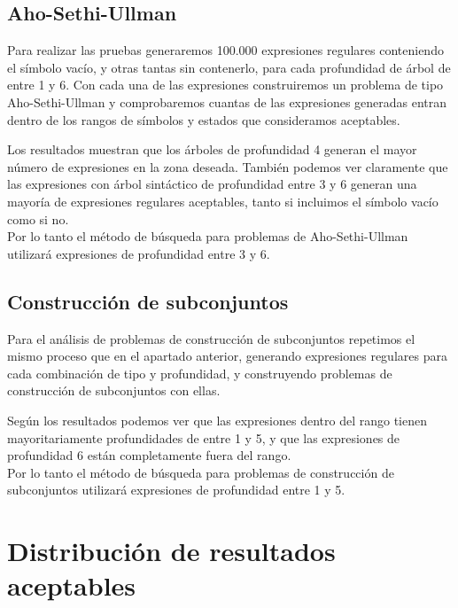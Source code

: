 \subsection{Aho-Sethi-Ullman}

Para realizar las pruebas generaremos 100.000 expresiones regulares conteniendo el símbolo vacío, y otras tantas sin contenerlo, para cada profundidad de árbol de entre 1 y 6.
Con cada una de las expresiones construiremos un problema de tipo Aho-Sethi-Ullman y comprobaremos cuantas de las expresiones generadas entran dentro de los rangos de símbolos y estados que consideramos aceptables.


Los resultados muestran que los árboles de profundidad 4 generan el mayor número de expresiones en la zona deseada.
También podemos ver claramente que las expresiones con árbol sintáctico de profundidad entre 3 y 6 generan una mayoría de expresiones regulares aceptables, tanto si incluimos el símbolo vacío como si no.
\\
Por lo tanto el método de búsqueda para problemas de Aho-Sethi-Ullman utilizará expresiones de profundidad entre 3 y 6.

\subsection{Construcción de subconjuntos}

Para el análisis de problemas de construcción de subconjuntos repetimos el mismo proceso que en el apartado anterior, generando expresiones regulares para cada combinación de tipo y profundidad, y construyendo problemas de construcción de subconjuntos con ellas.


Según los resultados podemos ver que las expresiones dentro del rango tienen mayoritariamente profundidades de entre 1 y 5, y que las expresiones de profundidad 6 están completamente fuera del rango.
\\
Por lo tanto el método de búsqueda para problemas de construcción de subconjuntos utilizará expresiones de profundidad entre 1 y 5.

\section{Distribución de resultados aceptables}

